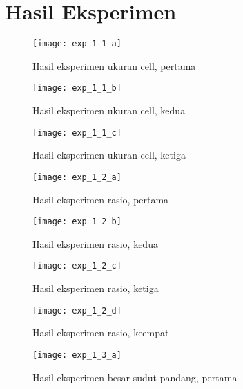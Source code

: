 \chapter{Hasil Eksperimen}
\label{lamp:B}

\def\scl{1}
\def\leg{} 
\def\std{none}
\def\ymin{}
\def\ymax{}

\begin{figure}[H]
	\centering  
	\texttt{[image: exp\_1\_1\_a]}
	\caption[Hasil eksperimen ukuran cell, pertama]{Hasil eksperimen ukuran cell, pertama}
	\label{fig:exp_1_1_a}
\end{figure}

\begin{figure}[H]
	\centering  
	\texttt{[image: exp\_1\_1\_b]}
	\caption[Hasil eksperimen ukuran cell, kedua]{Hasil eksperimen ukuran cell, kedua}
	\label{fig:exp_1_1_b}
\end{figure}

\begin{figure}[H]
	\centering  
	\texttt{[image: exp\_1\_1\_c]}
	\caption[Hasil eksperimen ukuran cell, ketiga]{Hasil eksperimen ukuran cell, ketiga}
	\label{fig:exp_1_1_c}
\end{figure}

\begin{figure}[H]
	\centering  
	\texttt{[image: exp\_1\_2\_a]}
	\caption[Hasil eksperimen rasio, pertama]{Hasil eksperimen rasio, pertama}
	\label{fig:exp_1_2_a}
\end{figure}

\begin{figure}[H]
	\centering  
	\texttt{[image: exp\_1\_2\_b]}
	\caption[Hasil eksperimen rasio, kedua]{Hasil eksperimen rasio, kedua}
	\label{fig:exp_1_2_b}
\end{figure}

\begin{figure}[H]
	\centering  
	\texttt{[image: exp\_1\_2\_c]}
	\caption[Hasil eksperimen rasio, ketiga]{Hasil eksperimen rasio, ketiga}
	\label{fig:exp_1_2_c}
\end{figure}

\begin{figure}[H]
	\centering  
	\texttt{[image: exp\_1\_2\_d]}
	\caption[Hasil eksperimen rasio, keempat]{Hasil eksperimen rasio, keempat}
	\label{fig:exp_1_2_d}
\end{figure}

\begin{figure}[H]
	\centering  
	\texttt{[image: exp\_1\_3\_a]}
	\caption[Hasil eksperimen besar sudut pandang, pertama]{Hasil eksperimen besar sudut pandang, pertama}
	\label{fig:exp_1_3_a}
\end{figure}


